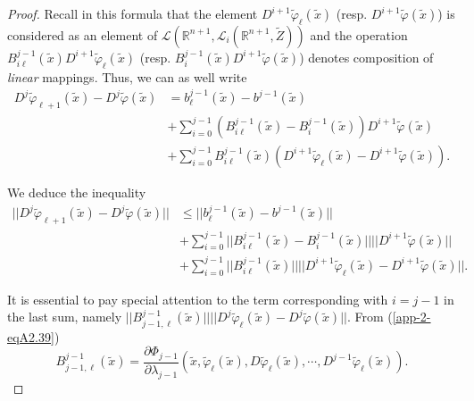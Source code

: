\begin{proof}
Recall in this formula that the element
$D^{i+1}\widetilde{\varphi}_{\ell}(\widetilde{x})$ (resp. $D^{i+1}
\widetilde{\varphi}(\widetilde{x})$) is considered as an element of
$\mathscr{L}(\mathbb{R}^{n+1}, \mathscr{L}_{i}(\mathbb{R}^{n+1},
\widetilde{Z}))$ and the operation $B_{i\ell}^{j-1}(\widetilde{x})
D^{i+1}\widetilde{\varphi}_{\ell}(\widetilde{x})$\pageoriginale
(resp. $B_{i}^{j-1} (\widetilde{x})
D^{i+1}\widetilde{\varphi}(\widetilde{x})$) denotes composition of
{\em linear} mappings. Thus, we can as well write
\begin{align*}
D^{j}\widetilde{\varphi}_{\ell + 1}(\widetilde{x}) -
D^{j}\widetilde{\varphi}(\widetilde{x}) &= b_{\ell}^{j-1}
(\widetilde{x}) - b^{j-1}(\widetilde{x})\\ 
&+ \sum\limits_{i=0}^{j-1}
(B_{i\ell}^{j-1} (\widetilde{x}) - B_{i}^{j-1}(\widetilde{x}))
D^{i+1}\widetilde{\varphi}(\widetilde{x})\\
& + \sum\limits_{i=0}^{j-1} B_{i\ell}^{j-1}  
(\widetilde{x}) (D^{i+1} \widetilde{\varphi}_{\ell}(\widetilde{x}) -
D^{i+1}\widetilde{\varphi}(\widetilde{x})). 
\end{align*}

We deduce the inequality
\begin{align*}
||D^{j}\widetilde{\varphi}_{\ell + 1}(\widetilde{x}) -
D^{j}\widetilde{\varphi}(\widetilde{x})|| &\leq
||b_{\ell}^{j-1}(\widetilde{x}) - b^{j-1}(\widetilde{x})||\\ 
&+\sum\limits_{i=0}^{j-1} ||B_{i \ell}^{j-1}(\widetilde{x}) -
B_{i}^{j-1} (\widetilde{x})||
||D^{i+1}\widetilde{\varphi}(\widetilde{x})|| \tag{A2.46} \label{app-2-eqA2.46}\\
& + \sum\limits_{i=0}^{j-1} ||B_{i\ell}^{j-1} (\widetilde{x})||
||D^{i+1} \widetilde{\varphi}_{\ell} (\widetilde{x}) - D^{i+1}\widetilde{\varphi}(\widetilde{x})||.
\end{align*}

It is essential to pay special attention to the term corresponding
with $i = j-1$ in the last sum, namely $||B_{j-1, \ell}^{j-1}
(\widetilde{x})|| ||D^{j}\widetilde{\varphi}_{\ell}(\widetilde{x}) -
D^{j}\widetilde{\varphi}(\widetilde{x})||$. From (\ref{app-2-eqA2.39})
$$
B_{j-1,\ell}^{j-1} (\widetilde{x}) = \frac{\partial
  \Phi_{j-1}}{\partial \lambda_{j-1}} (\widetilde{x},
\widetilde{\varphi}_{\ell} (\widetilde{x}),
D\widetilde{\varphi}_{\ell}(\widetilde{x}), \cdots,
D^{j-1}\widetilde{\varphi}_{\ell}(\widetilde{x})). 
$$


\end{proof}
